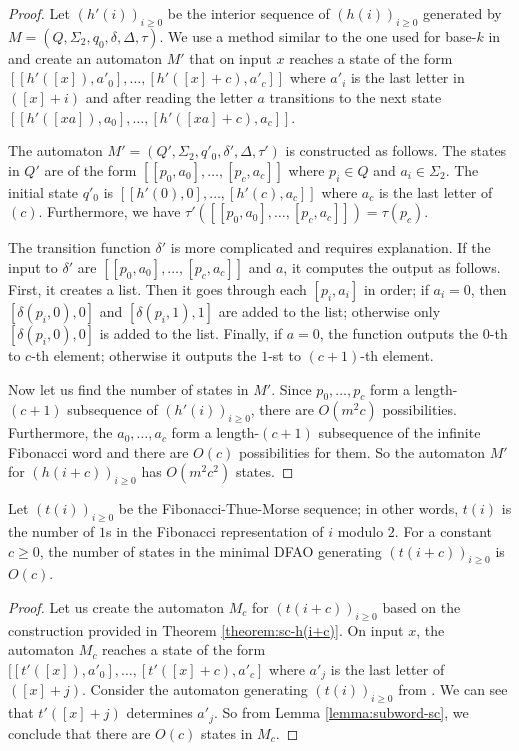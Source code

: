\documentclass[12pt,reqno]{article}
\begin{document}
\begin{proof}
    \sloppy
    Let $(h'(i))_{i \geq 0}$ be the interior sequence of $(h(i))_{i \geq 0}$ generated by $M=(Q, \Sigma_2, q_0, \delta, \Delta, \tau)$.
    We use a method similar to the one used for base-$k$ in \cite{moradi_complexity_2026} and create an automaton $M'$ that on input $x$ reaches a state of the form $
    [[h'([x]), a'_0], \ldots, [h'([x]+c), a'_c]]
    $ where $a'_i$ is the last letter in $([x]+i)$ and after reading the letter $a$ transitions to the next state 
    $[[h'([xa]), a_0], \ldots, [h'([xa]+c), a_c]]$.
    
    The automaton $M'=(Q', \Sigma_2, q'_0, \delta', \Delta, \tau')$ is constructed as follows.
    The states in $Q'$ are of the form $[[p_0, a_0], \ldots, [p_c, a_c]]$ where $p_i \in Q$ and $a_i \in \Sigma_2$.
    The initial state $q'_0$ is $[[h'(0),0], \ldots, [h'(c), a_c]]$ where $a_c$ is the last letter of $(c)$.
    Furthermore, we have $\tau'([[p_0, a_0], \ldots, [p_c, a_c]]) = \tau(p_c)$.
    
    The transition function $\delta'$ is more complicated and requires explanation.
    If the input to $\delta'$ are $[[p_0, a_0], \ldots, [p_c, a_c]]$ and $a$, it computes the output as follows. First, it creates a list. Then it goes through each $[p_i, a_i]$ in order; if $a_i=0$, then $[\delta(p_i, 0), 0]$ and $[\delta(p_i, 1), 1]$ are added to the list; otherwise only $[\delta(p_i, 0), 0]$ is added to the list. Finally, if $a=0$, the function outputs the $0$-th to $c$-th element; otherwise it outputs the $1$-st to $(c+1)$-th element. 
    
    Now let us find the number of states in $M'$. Since $p_0, \ldots, p_c$ form a length-$(c+1)$ subsequence of $(h'(i))_{i \geq 0}$, there are $O(m^2c)$ possibilities. Furthermore, the $a_0, \ldots, a_c$ form a length-$(c+1)$ subsequence of the infinite Fibonacci word and there are $O(c)$ possibilities for them.
    So the automaton $M'$ for $(h(i+c))_{i \geq 0}$ has $O(m^2c^2)$ states.
\end{proof}


\begin{theorem}
Let $(t(i))_{i \geq 0}$ be the Fibonacci-Thue-Morse sequence; in other words, $t(i)$ is the number of $1$s in the Fibonacci representation of $i$ modulo $2$. For a constant $c \geq 0$, the number of states in the minimal DFAO generating $(t(i+c))_{i \geq 0}$ is $O(c)$.
\end{theorem}

\begin{proof}
    Let us create the automaton $M_c$ for $(t(i+c))_{i \geq 0}$ based on the construction provided in Theorem \ref{theorem:sc-h(i+c)}.
    On input $x$, the automaton $M_c$ reaches a state of the form $[ [t'([x]), a'_0], \ldots,  [t'([x]+c), a'_c]$ where $a'_j$ is the last letter of $([x]+j)$.
    Consider the automaton generating $(t(i))_{i \geq 0}$ from  \cite{shallit_subword_2021}. We can see that $t'([x]+j)$ determines $a'_j$. So from Lemma \ref{lemma:subword-sc}, we conclude that there are $O(c)$ states in $M_c$. 
\end{proof}
\end{document}
